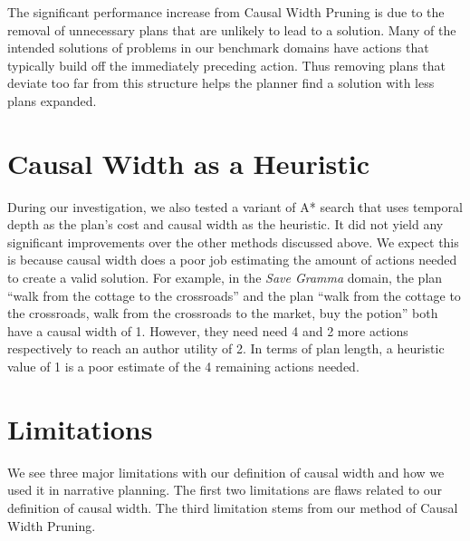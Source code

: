 \documentclass[letterpaper]{article} %
\begin{document}
The significant performance increase from Causal Width Pruning is due to the removal of unnecessary plans that are unlikely to lead to a solution. Many of the intended solutions of problems in our benchmark domains have actions that typically build off the immediately preceding action. Thus removing plans that deviate too far from this structure helps the planner find a solution with less plans expanded.

\section{Causal Width as a Heuristic}

During our investigation, we also tested a variant of A* search that uses temporal depth as the plan's cost and causal width as the heuristic. It did not yield any significant improvements over the other methods discussed above. We expect this is because causal width does a poor job estimating the amount of actions needed to create a valid solution. For example, in the \textit{Save Gramma} domain, the plan ``walk from the cottage to the crossroads'' and the plan ``walk from the cottage to the crossroads, walk from the crossroads to the market, buy the potion'' both have a causal width of 1. However, they need need 4 and 2 more actions respectively to reach an author utility of 2. In terms of plan length, a heuristic value of 1 is a poor estimate of the 4 remaining actions needed.

\section{Limitations}

We see three major limitations with our definition of causal width and how we used it in narrative planning. The first two limitations are flaws related to our definition of causal width. The third limitation stems from our method of Causal Width Pruning. 
\end{document}

